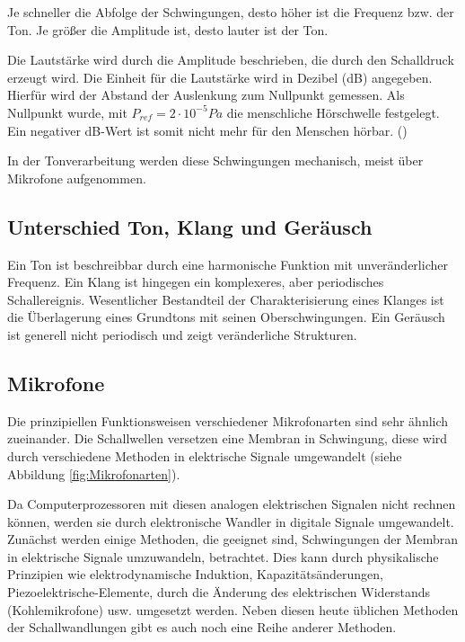 Je schneller die Abfolge der Schwingungen, desto höher ist die Frequenz bzw. der Ton. Je größer die Amplitude ist, desto lauter ist der Ton. 

Die Lautstärke wird durch die Amplitude beschrieben, die durch den Schalldruck erzeugt wird. Die Einheit für die Lautstärke wird in Dezibel (dB) angegeben. Hierfür wird der Abstand der Auslenkung zum Nullpunkt gemessen. Als Nullpunkt wurde, mit $P_{ref} = 2 \cdot 10^{-5} Pa$ die menschliche Hörschwelle festgelegt. Ein negativer dB-Wert ist somit nicht mehr für den Menschen hörbar. (\cite{Luders:2017})

In der Tonverarbeitung werden diese Schwingungen mechanisch, meist über Mikrofone aufgenommen.

\subsection{Unterschied Ton, Klang und Geräusch }

Ein Ton ist beschreibbar durch eine harmonische Funktion mit unveränderlicher Frequenz.
Ein Klang ist hingegen ein komplexeres, aber periodisches Schallereignis.
Wesentlicher Bestandteil der Charakterisierung eines Klanges ist die Überlagerung eines 
Grundtons mit seinen Oberschwingungen.
Ein Geräusch ist generell nicht periodisch und zeigt  veränderliche Strukturen. 

\subsection{Mikrofone}

Die prinzipiellen Funktionsweisen verschiedener Mikrofonarten sind sehr ähnlich zueinander. 
Die Schallwellen versetzen eine Membran in Schwingung, diese wird durch verschiedene Methoden 
in elektrische Signale umgewandelt (siehe Abbildung \ref{fig:Mikrofonarten}).

Da Computerprozessoren mit diesen analogen elektrischen Signalen nicht rechnen können, werden 
sie durch elektronische Wandler in digitale Signale umgewandelt. Zunächst werden einige Methoden, die geeignet sind, Schwingungen der Membran in elektrische Signale umzuwandeln, betrachtet. Dies kann durch physikalische Prinzipien wie elektrodynamische Induktion, Kapazitätsänderungen, Piezoelektrische-Elemente, durch die Änderung des elektrischen Widerstands (Kohlemikrofone) usw. umgesetzt werden.
Neben diesen heute üblichen Methoden der Schallwandlungen gibt es auch noch eine Reihe anderer Methoden.

